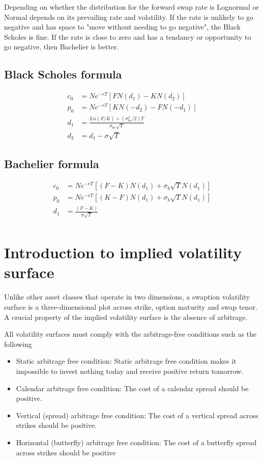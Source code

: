 \documentclass[11pt]{article}
\begin{document}
Depending on whether the distribution for the forward swap rate is Lognormal or Normal depends on its prevailing rate and volatility.  If the rate is unlikely to go negative and has space to "move without needing to go negative", the Black Scholes is fine.  If the rate is close to zero and has a tendancy or opportunity to go negative, then Bachelier is better.\par

\subsection{Black Scholes formula}
\begin{align}
	c_0 & =  N e^{-rT}\left [ F N(d_1) - K N(d_2) \right ] \\
	p_0 & =  N e^{-rT}\left [ K N(-d_2) - F N(-d_1) \right ] \\
	d_1& = \displaystyle \frac{Ln(F/K)+(\sigma_{bs}^2/2)T}{\sigma_{bs} \sqrt{T}} \\
	d_2 &= d_1 - \sigma \sqrt{T}
\end{align}

\subsection{Bachelier formula}

\begin{align}
	c_0 & =  N e^{-rT}\left [ (F-K) N(d_1) + \sigma_{b} \sqrt{T}N(d_1) \right ] \\
	p_0 & =  N e^{-rT}\left [ (K-F) N(d_1) + \sigma_{b} \sqrt{T}N(d_1) \right ] \\
	d_1& = \displaystyle \frac{(F-K)}{\sigma \sqrt{T}} \\
\end{align}
\section{Introduction to implied volatility surface}

Unlike other asset classes that operate in two dimensions, a swaption volatility surface is a three-dimensional plot across strike, option maturity and swap tenor.  A crucial property of the implied volatility surface is the absence of arbitrage. \par
All volatility surfaces must comply with the arbitrage-free conditions such as the following \par

\begin{itemize}
	\item Static arbitrage free condition: Static arbitrage free condition makes it impossible to invest nothing today and receive positive return tomorrow. 
	\item Calendar arbitrage free condition: The cost of a calendar spread should be positive.
	\item Vertical (spread) arbitrage free condition: The cost of a vertical spread across strikes should be positive.
	\item Horizontal (butterfly) arbitrage free condition: The cost of a butterfly spread across strikes should be positive
\end{itemize}
\end{document}
